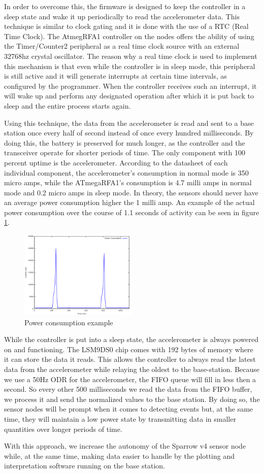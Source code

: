 In order to overcome this, the firmware is designed to keep the controller in a sleep state and wake it up periodically to read the accelerometer data. 
This technique is similar to clock gating and it is done with the use of a RTC (Real Time Clock). The AtmegRFA1 controller on the nodes offers the ability of using the Timer/Counter2 
peripheral as a real time clock source with an external 32768hz crystal oscillator. The reason why a real time clock is used to implement this mechanism is that even while the controller 
is in sleep mode, this peripheral is still active and it will generate interrupts at certain time intervals, as configured by the programmer. When the controller receives such an 
interrupt, it will wake up and perform any designated operation after which it is put back to sleep and the entire process starts again.

Using this technique, the data from the accelerometer is read and sent to a base station once every half of second instead of once every hundred milliseconds. By doing this, 
the battery is preserved for much longer, as the controller and the transceiver operate for shorter periods of time. The only component with 100 percent uptime is the 
accelerometer. According to the datasheet of each individual component, the accelerometer's consumption in normal mode is 350 micro amps, while the ATmegaRFA1's consumption is
4.7 milli amps in normal mode and 0.2 micro amps in sleep mode. In theory, the sensors should never have  an average power consumption higher the 1 milli amp. An example of the actual power consumption over the course of 1.1 seconds of activity can be seen in figure \ref{power}.

\begin{figure}[ht] \centering
  \includegraphics[width=0.5\textwidth]{img/power-graph.png}
  \caption{Power consumption example}
  \label{power}
\end{figure}

While the controller is put into a sleep state, the accelerometer is always powered on and functioning. The LSM9DS0 chip comes with 192 bytes of memory where it can store the data it reads. This allows the controller to always read the latest data from the accelerometer while relaying the oldest to the base-station. Because we use a 50Hz ODR for the accelerometer, the FIFO queue will fill in less then a second. So every other 500 milliseconds we read the data from the FIFO buffer, we process it and send the normalized values to the base station. By doing so, the sensor nodes will be prompt when it comes to detecting events but, at the same time, they will maintain a low power state by transmitting data in smaller quantities over longer periods of time.

With this approach, we increase the autonomy of the Sparrow v4 sensor node while, at the same time, making data easier to handle by the plotting and interpretation software running 
on the base station.
